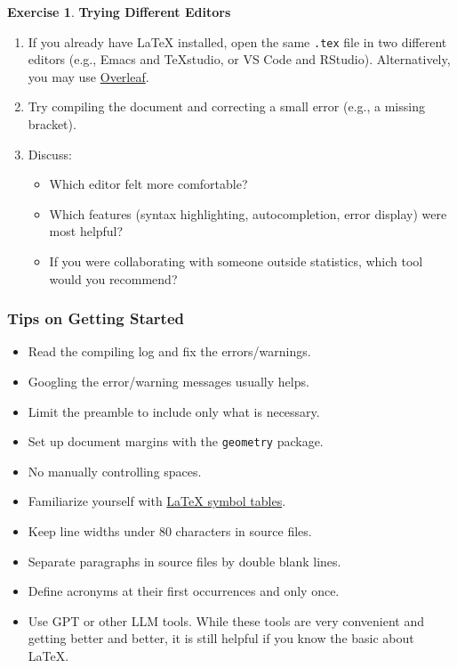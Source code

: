 \documentclass[
]{book}
\providecommand{\tightlist}{%
  \setlength{\itemsep}{0pt}\setlength{\parskip}{0pt}}
\theoremstyle{definition}
\theoremstyle{definition}
\theoremstyle{definition}
\newtheorem{exercise}{Exercise}[chapter]
\theoremstyle{definition}
\theoremstyle{remark}
\begin{document}
\begin{exercise}

\textbf{Trying Different Editors}

\begin{enumerate}
\def\labelenumi{\arabic{enumi}.}
\tightlist
\item
  If you already have LaTeX installed, open the same \texttt{.tex} file in two
  different editors (e.g., Emacs and TeXstudio, or VS Code and RStudio).
  Alternatively, you may use \href{https://www.overleaf.com/}{Overleaf}.
\item
  Try compiling the document and correcting a small error (e.g., a missing
  bracket).
\item
  Discuss:

  \begin{itemize}
  \tightlist
  \item
    Which editor felt more comfortable?
  \item
    Which features (syntax highlighting, autocompletion, error display) were
    most helpful?
  \item
    If you were collaborating with someone outside statistics, which tool would
    you recommend?
  \end{itemize}
\end{enumerate}

\end{exercise}

\subsubsection{Tips on Getting Started}\label{tips-on-getting-started}

\begin{itemize}
\tightlist
\item
  Read the compiling log and fix the errors/warnings.
\item
  Googling the error/warning messages usually helps.
\item
  Limit the preamble to include only what is necessary.
\item
  Set up document margins with the \texttt{geometry} package.
\item
  No manually controlling spaces.
\item
  Familiarize yourself with \href{https://artofproblemsolving.com/wiki/index.php/LaTeX:Symbols}{LaTeX symbol
  tables}.
\item
  Keep line widths under 80 characters in source files.
\item
  Separate paragraphs in source files by double blank lines.
\item
  Define acronyms at their first occurrences and only once.
\item
  Use GPT or other LLM tools. While these tools are very convenient and getting
  better and better, it is still helpful if you know the basic about LaTeX.
\end{itemize}
\end{document}
